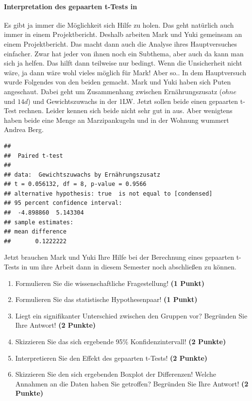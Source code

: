 \documentclass[a4paper, 9pt]{scrartcl}\usepackage[]{graphicx}\usepackage[]{xcolor}
\makeatletter
\newenvironment{kframe}{%
 \def\at@end@of@kframe{}%
 \ifinner\ifhmode%
  \def\at@end@of@kframe{\end{minipage}}%
  \begin{minipage}{\columnwidth}%
 \fi\fi%
 \def\FrameCommand##1{\hskip\@totalleftmargin \hskip-\fboxsep
 \colorbox{shadecolor}{##1}\hskip-\fboxsep
     \hskip-\linewidth \hskip-\@totalleftmargin \hskip\columnwidth}%
 \MakeFramed {\advance\hsize-\width
   \@totalleftmargin\z@ \linewidth\hsize
   \@setminipage}}%
 {\par\unskip\endMakeFramed%
 \at@end@of@kframe}
\newenvironment{knitrout}{}{} %
\makeatother
\begin{document}
\ifcollection
\paragraph{Interpretation des gepaarten t-Tests in \Rlogo}
\fi

Es gibt ja immer die Möglichkeit sich Hilfe zu holen. Das geht natürlich auch immer in einem Projektbericht. Deshalb arbeiten Mark und Yuki gemeinsam an einem Projektbericht. Das macht dann auch die Analyse ihres Hauptversuches einfacher. Zwar hat jeder von ihnen noch ein Subthema, aber auch da kann man sich ja helfen. Das hilft dann teilweise nur bedingt. Wenn die Unsicherheit nicht wäre, ja dann wäre wohl vieles möglich für Mark! Aber so.. In dem Hauptversuch wurde Folgendes von den beiden gemacht. Mark und Yuki haben sich Puten angeschaut. Dabei geht um Zusammenhang zwischen Ernährungszusatz ($ohne$ und $14d$) und Gewichtszuwachs in der 1LW. Jetzt sollen beide einen gepaarten t-Test rechnen. Leider kennen sich beide nicht sehr gut in \Rlogo aus. Aber wenigtens haben beide eine Menge an Marzipankugeln und in der Wohnung wummert Andrea Berg.

\begin{knitrout}
\color{fgcolor}\begin{kframe}
\begin{verbatim}
## 
## 	Paired t-test
## 
## data:  Gewichtszuwachs by Ernährungszusatz
## t = 0.056132, df = 8, p-value = 0.9566
## alternative hypothesis: true  is not equal to [condensed]
## 95 percent confidence interval:
##  -4.898860  5.143304
## sample estimates:
## mean difference 
##       0.1222222
\end{verbatim}
\end{kframe}
\end{knitrout}

Jetzt brauchen Mark und Yuki Ihre Hilfe bei der Berechnung eines gepaarten t-Tests in \Rlogo um ihre Arbeit dann in diesem Semester noch abschließen zu können.

\begin{enumerate}
  \item Formulieren Sie die wissenschaftliche Fragestellung! \textbf{(1 Punkt)}
  \item Formulieren Sie das statistische Hypothesenpaar! \textbf{(1 Punkt)}
\item Liegt ein signifikanter Unterschied zwischen den Gruppen vor?
  Begründen Sie Ihre Antwort! \textbf{(2 Punkte)}
\item Skizzieren Sie das sich ergebende 95\% Konfidenzintervall! \textbf{(2 Punkte)}
\item Interpretieren Sie den Effekt des gepaarten t-Tests! \textbf{(2 Punkte)}
\item Skizzieren Sie den sich ergebenden Boxplot der Differenzen! Welche Annahmen an die Daten haben Sie getroffen? Begründen Sie Ihre Antwort! \textbf{(2 Punkte)} 
\end{enumerate}
 
\end{document}
